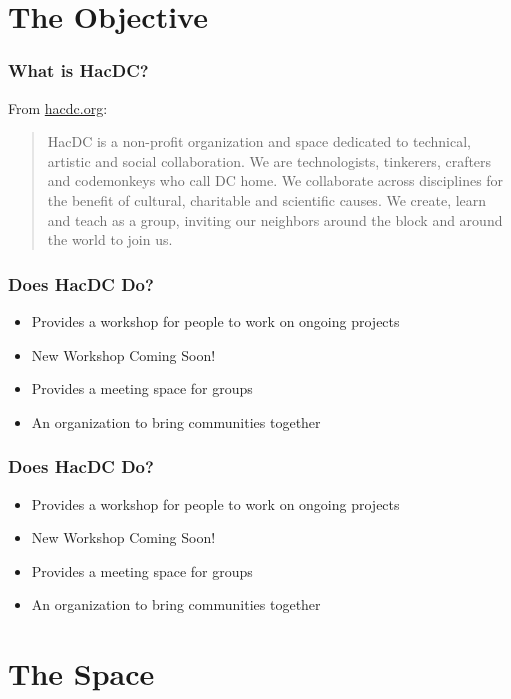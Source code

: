 \documentclass[notes]{beamer}
\begin{document}
\section{The Objective}

\begin{frame}
  \frametitle{What is HacDC?}
  From \href{http://www.hacdc.org}{hacdc.org}:
  \begin{quote}
    HacDC is a non-profit organization and space dedicated to
    technical, artistic and social collaboration. We are
    technologists, tinkerers, crafters and codemonkeys who call DC
    home. We collaborate across disciplines for the benefit of
    cultural, charitable and scientific causes. We create, learn and
    teach as a group, inviting our neighbors around the block and
    around the world to join us.
  \end{quote}
\end{frame}

\begin{frame}
  \frametitle{Does HacDC Do?}
  \begin{itemize}
  \item Provides a workshop for people to work on ongoing projects
  \item New Workshop Coming Soon!
  \item Provides a meeting space for groups
  \item An organization to bring communities together
  \end{itemize}
\end{frame}

\begin{frame}
  \frametitle{Does HacDC Do?}
  \begin{itemize}
  \item Provides a workshop for people to work on ongoing projects
  \item New Workshop Coming Soon!
  \item Provides a meeting space for groups
  \item An organization to bring communities together
  \end{itemize}
\end{frame}

\section{The Space}
\end{document}
